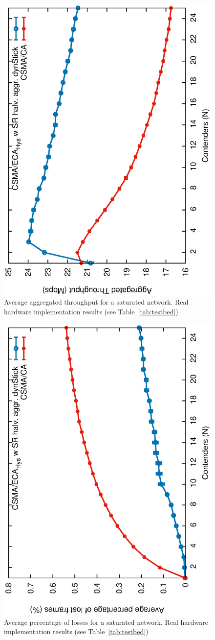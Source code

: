 	\begin{figure}[tb]
		\centering
		\includegraphics[width=0.7\linewidth,angle=-90]{figures/tonFigs/throughput-sat-SR-IMPLEMENTATION.eps}
		\caption{Average aggregated throughput for a saturated network. Real hardware implementation results (see Table~\ref{tab:testbed})}
		\label{fig:throughputImplementation}
	\end{figure}
	
	\begin{figure}[tb]
		\centering
		\includegraphics[width=0.7\linewidth,angle=-90]{figures/tonFigs/losses-sat-SR-IMPLEMENTATION.eps}
		\caption{Average percentage of losses for a saturated network. Real hardware implementation results (see Table~\ref{tab:testbed})}
		\label{fig:lossesImplementation}
	\end{figure}


